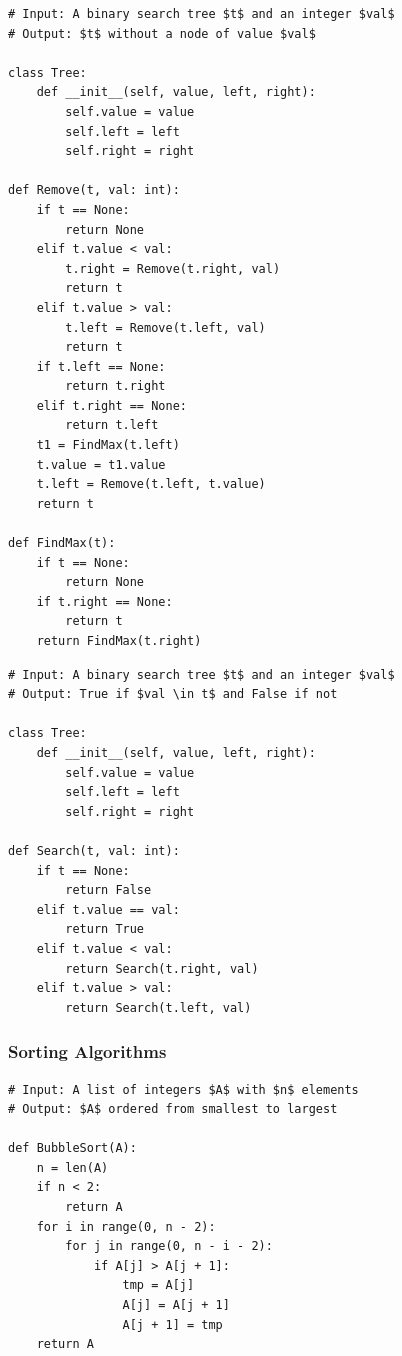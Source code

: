 \begin{lstlisting}[caption={The result of transpiling \Cref{removeGourmet} to Python.}, captionpos=b, label={removePython}]
# Input: A binary search tree $t$ and an integer $val$
# Output: $t$ without a node of value $val$

class Tree:
    def __init__(self, value, left, right):
        self.value = value
        self.left = left
        self.right = right

def Remove(t, val: int):
    if t == None:
        return None
    elif t.value < val:
        t.right = Remove(t.right, val)
        return t
    elif t.value > val:
        t.left = Remove(t.left, val)
        return t
    if t.left == None:
        return t.right
    elif t.right == None:
        return t.left
    t1 = FindMax(t.left)
    t.value = t1.value
    t.left = Remove(t.left, t.value)
    return t

def FindMax(t):
    if t == None:
        return None
    if t.right == None:
        return t
    return FindMax(t.right)
\end{lstlisting}

\begin{lstlisting}[caption={The result of transpiling \Cref{searchGourmet} to Python.}, captionpos=b, label={searchPython}]
# Input: A binary search tree $t$ and an integer $val$
# Output: True if $val \in t$ and False if not

class Tree:
    def __init__(self, value, left, right):
        self.value = value
        self.left = left
        self.right = right

def Search(t, val: int):
    if t == None:
        return False
    elif t.value == val:
        return True
    elif t.value < val:
        return Search(t.right, val)
    elif t.value > val:
        return Search(t.left, val)
\end{lstlisting}


\subsubsection{Sorting Algorithms}

\begin{lstlisting}[caption={The result of transpiling \Cref{bubbleSortGourmet} to Python.}, captionpos=b, label={bubbleSortPython}]
# Input: A list of integers $A$ with $n$ elements
# Output: $A$ ordered from smallest to largest

def BubbleSort(A):
    n = len(A)
    if n < 2:
        return A
    for i in range(0, n - 2):
        for j in range(0, n - i - 2):
            if A[j] > A[j + 1]:
                tmp = A[j]
                A[j] = A[j + 1]
                A[j + 1] = tmp
    return A
\end{lstlisting}

